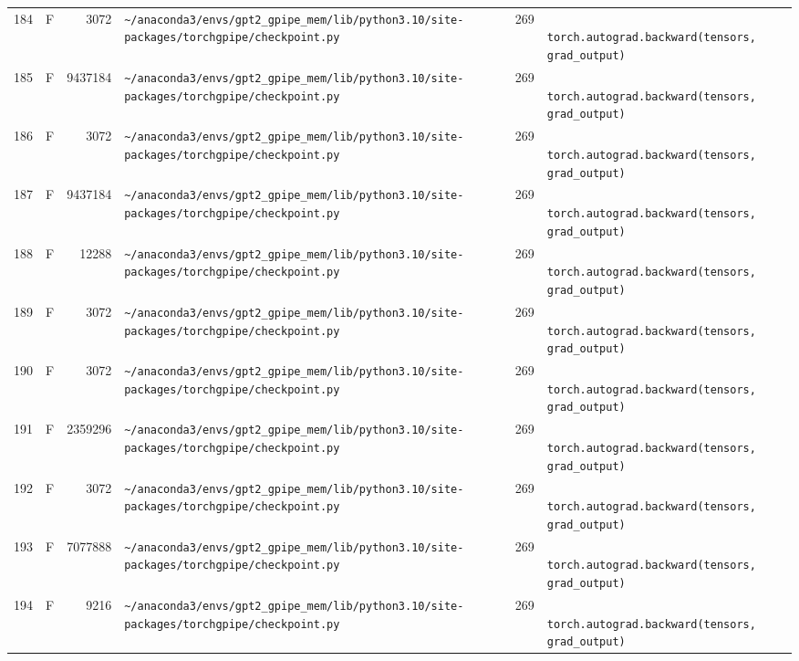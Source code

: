 \documentclass{article}
\begin{document}
\begin{longtable}{r l r p{6.5cm} r p{7.0cm}}
184 & F & 3072 & \lstinline|~/anaconda3/envs/gpt2_gpipe_mem/lib/python3.10/site-packages/torchgpipe/checkpoint.py| & 269 & \lstinline|            torch.autograd.backward(tensors, grad_output)| \\
185 & F & 9437184 & \lstinline|~/anaconda3/envs/gpt2_gpipe_mem/lib/python3.10/site-packages/torchgpipe/checkpoint.py| & 269 & \lstinline|            torch.autograd.backward(tensors, grad_output)| \\
186 & F & 3072 & \lstinline|~/anaconda3/envs/gpt2_gpipe_mem/lib/python3.10/site-packages/torchgpipe/checkpoint.py| & 269 & \lstinline|            torch.autograd.backward(tensors, grad_output)| \\
187 & F & 9437184 & \lstinline|~/anaconda3/envs/gpt2_gpipe_mem/lib/python3.10/site-packages/torchgpipe/checkpoint.py| & 269 & \lstinline|            torch.autograd.backward(tensors, grad_output)| \\
188 & F & 12288 & \lstinline|~/anaconda3/envs/gpt2_gpipe_mem/lib/python3.10/site-packages/torchgpipe/checkpoint.py| & 269 & \lstinline|            torch.autograd.backward(tensors, grad_output)| \\
189 & F & 3072 & \lstinline|~/anaconda3/envs/gpt2_gpipe_mem/lib/python3.10/site-packages/torchgpipe/checkpoint.py| & 269 & \lstinline|            torch.autograd.backward(tensors, grad_output)| \\
190 & F & 3072 & \lstinline|~/anaconda3/envs/gpt2_gpipe_mem/lib/python3.10/site-packages/torchgpipe/checkpoint.py| & 269 & \lstinline|            torch.autograd.backward(tensors, grad_output)| \\
191 & F & 2359296 & \lstinline|~/anaconda3/envs/gpt2_gpipe_mem/lib/python3.10/site-packages/torchgpipe/checkpoint.py| & 269 & \lstinline|            torch.autograd.backward(tensors, grad_output)| \\
192 & F & 3072 & \lstinline|~/anaconda3/envs/gpt2_gpipe_mem/lib/python3.10/site-packages/torchgpipe/checkpoint.py| & 269 & \lstinline|            torch.autograd.backward(tensors, grad_output)| \\
193 & F & 7077888 & \lstinline|~/anaconda3/envs/gpt2_gpipe_mem/lib/python3.10/site-packages/torchgpipe/checkpoint.py| & 269 & \lstinline|            torch.autograd.backward(tensors, grad_output)| \\
194 & F & 9216 & \lstinline|~/anaconda3/envs/gpt2_gpipe_mem/lib/python3.10/site-packages/torchgpipe/checkpoint.py| & 269 & \lstinline|            torch.autograd.backward(tensors, grad_output)| \\

\end{longtable}
\end{document}
